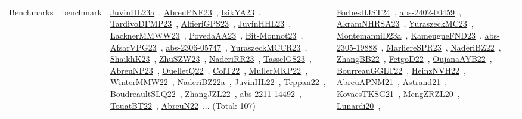 {\begin{longtable}{lp{3cm}>{\raggedright\arraybackslash}p{6cm}>{\raggedright\arraybackslash}p{6cm}>{\raggedright\arraybackslash}p{8cm}}
Benchmarks & benchmark & \href{../works/JuvinHL23a.pdf}{JuvinHL23a}~\cite{JuvinHL23a}, \href{../works/AbreuPNF23.pdf}{AbreuPNF23}~\cite{AbreuPNF23}, \href{../works/IsikYA23.pdf}{IsikYA23}~\cite{IsikYA23}, \href{../works/TardivoDFMP23.pdf}{TardivoDFMP23}~\cite{TardivoDFMP23}, \href{../works/AlfieriGPS23.pdf}{AlfieriGPS23}~\cite{AlfieriGPS23}, \href{../works/JuvinHHL23.pdf}{JuvinHHL23}~\cite{JuvinHHL23}, \href{../works/LacknerMMWW23.pdf}{LacknerMMWW23}~\cite{LacknerMMWW23}, \href{../works/PovedaAA23.pdf}{PovedaAA23}~\cite{PovedaAA23}, \href{../works/Bit-Monnot23.pdf}{Bit-Monnot23}~\cite{Bit-Monnot23}, \href{../works/AfsarVPG23.pdf}{AfsarVPG23}~\cite{AfsarVPG23}, \href{../works/abs-2306-05747.pdf}{abs-2306-05747}~\cite{abs-2306-05747}, \href{../works/YuraszeckMCCR23.pdf}{YuraszeckMCCR23}~\cite{YuraszeckMCCR23}, \href{../works/ShaikhK23.pdf}{ShaikhK23}~\cite{ShaikhK23}, \href{../works/ZhuSZW23.pdf}{ZhuSZW23}~\cite{ZhuSZW23}, \href{../works/NaderiRR23.pdf}{NaderiRR23}~\cite{NaderiRR23}, \href{../works/TasselGS23.pdf}{TasselGS23}~\cite{TasselGS23}, \href{../works/AbreuNP23.pdf}{AbreuNP23}~\cite{AbreuNP23}, \href{../works/OuelletQ22.pdf}{OuelletQ22}~\cite{OuelletQ22}, \href{../works/ColT22.pdf}{ColT22}~\cite{ColT22}, \href{../works/MullerMKP22.pdf}{MullerMKP22}~\cite{MullerMKP22}, \href{../works/WinterMMW22.pdf}{WinterMMW22}~\cite{WinterMMW22}, \href{../works/NaderiBZ22a.pdf}{NaderiBZ22a}~\cite{NaderiBZ22a}, \href{../works/JuvinHL22.pdf}{JuvinHL22}~\cite{JuvinHL22}, \href{../works/Teppan22.pdf}{Teppan22}~\cite{Teppan22}, \href{../works/BoudreaultSLQ22.pdf}{BoudreaultSLQ22}~\cite{BoudreaultSLQ22}, \href{../works/ZhangJZL22.pdf}{ZhangJZL22}~\cite{ZhangJZL22}, \href{../works/abs-2211-14492.pdf}{abs-2211-14492}~\cite{abs-2211-14492}, \href{../works/TouatBT22.pdf}{TouatBT22}~\cite{TouatBT22}, \href{../works/AbreuN22.pdf}{AbreuN22}~\cite{AbreuN22}... (Total: 107) & \href{../works/ForbesHJST24.pdf}{ForbesHJST24}~\cite{ForbesHJST24}, \href{../works/abs-2402-00459.pdf}{abs-2402-00459}~\cite{abs-2402-00459}, \href{../works/AkramNHRSA23.pdf}{AkramNHRSA23}~\cite{AkramNHRSA23}, \href{../works/YuraszeckMC23.pdf}{YuraszeckMC23}~\cite{YuraszeckMC23}, \href{../works/MontemanniD23a.pdf}{MontemanniD23a}~\cite{MontemanniD23a}, \href{../works/KameugneFND23.pdf}{KameugneFND23}~\cite{KameugneFND23}, \href{../works/abs-2305-19888.pdf}{abs-2305-19888}~\cite{abs-2305-19888}, \href{../works/MarliereSPR23.pdf}{MarliereSPR23}~\cite{MarliereSPR23}, \href{../works/NaderiBZ22.pdf}{NaderiBZ22}~\cite{NaderiBZ22}, \href{../works/ZhangBB22.pdf}{ZhangBB22}~\cite{ZhangBB22}, \href{../works/FetgoD22.pdf}{FetgoD22}~\cite{FetgoD22}, \href{../works/OujanaAYB22.pdf}{OujanaAYB22}~\cite{OujanaAYB22}, \href{../works/BourreauGGLT22.pdf}{BourreauGGLT22}~\cite{BourreauGGLT22}, \href{../works/HeinzNVH22.pdf}{HeinzNVH22}~\cite{HeinzNVH22}, \href{../works/AbreuAPNM21.pdf}{AbreuAPNM21}~\cite{AbreuAPNM21}, \href{../works/Astrand21.pdf}{Astrand21}~\cite{Astrand21}, \href{../works/KovacsTKSG21.pdf}{KovacsTKSG21}~\cite{KovacsTKSG21}, \href{../works/MengZRZL20.pdf}{MengZRZL20}~\cite{MengZRZL20}, \href{../works/Lunardi20.pdf}{Lunardi20}~\cite{Lunardi20}, 
\end{longtable}}
